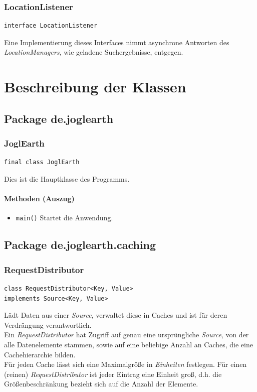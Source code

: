 \documentclass[10pt]{scrreprt}
\begin{document}
\vspace{5mm}
\subsection*{LocationListener}
\begin{lstlisting}
interface LocationListener
\end{lstlisting}
Eine Implementierung dieses Interfaces nimmt asynchrone Antworten des \textit{LocationManagers}, wie geladene Suchergebnisse, entgegen.\\




\chapter{Beschreibung der Klassen}
\section{Package de.joglearth}
\subsection*{JoglEarth}
\begin{lstlisting}
final class JoglEarth
\end{lstlisting}
Dies ist die Hauptklasse des Programms.\\
\subsubsection*{Methoden (Auszug)}
\begin{itemize}\item\texttt{main()} Startet die Anwendung.
\end{itemize}


\vspace{5mm}
\section{Package de.joglearth.caching}
\subsection*{RequestDistributor}
\begin{lstlisting}
class RequestDistributor<Key, Value>
implements Source<Key, Value>
\end{lstlisting}
Lädt Daten aus einer \textit{Source}, verwaltet diese in Caches und ist für deren Verdrängung verantwortlich.\\
Ein \textit{RequestDistributor} hat Zugriff auf genau eine ursprüngliche \textit{Source}, von der alle Datenelemente stammen, sowie auf eine beliebige Anzahl an Caches, die eine Cachehierarchie bilden.\\
Für jeden Cache lässt sich eine Maximalgröße in \textit{Einheiten} festlegen. Für einen (reinen) \textit{RequestDistributor} ist jeder Eintrag eine Einheit groß, d.h. die Größenbeschränkung bezieht sich auf die Anzahl der Elemente.\\
\end{document}
